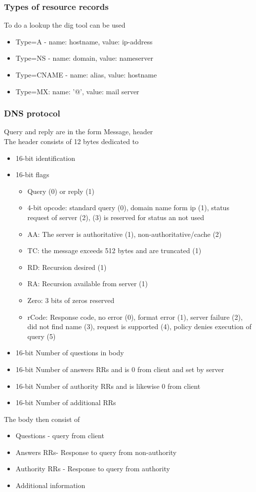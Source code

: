 \documentclass[12pt, a4paper]{article}
\begin{document}
			\subsubsection{Types of resource records}
				To do a lookup the dig tool can be used
				\begin{itemize}
					\item Type=A - name: hostname, value: ip-address
					\item Type=NS - name: domain, value: nameserver
					\item Type=CNAME - name: alias, value: hostname
					\item Type=MX: name: '@', value: mail server
				\end{itemize}
			\subsubsection{DNS protocol}
				Query and reply are in the form Message, header\\
				The header consists of 12 bytes dedicated to
				\begin{itemize}
					\item 16-bit identification
					\item 16-bit flags
					\begin{itemize}
						\item Query (0) or reply (1)
						\item 4-bit opcode: standard query (0), domain name form ip (1), status request of server (2), (3) is reserved for status an not used
						\item AA: The server is authoritative (1), non-authoritative/cache (2)
						\item TC: the message exceeds 512 bytes and are truncated (1)
						\item RD: Recursion desired (1)
						\item RA: Recursion available from server (1)
						\item Zero: 3 bits of zeros reserved
						\item rCode: Response code, no error (0), format error (1), server failure (2), did not find name (3), request is supported (4), policy denies execution of query (5)
					\end{itemize}
					\item 16-bit Number of questions in body
					\item 16-bit Number of answers RRs and is 0 from client and set by server 
					\item 16-bit Number of authority RRs and is likewise 0 from client
					\item 16-bit Number of additional RRs 
				\end{itemize}
				The body then consist of
				\begin{itemize}
					\item Questions - query from client
					\item Answers RRs- Response to query from non-authority
					\item Authority RRs -  Response to query from authority
					\item Additional information 
				\end{itemize}
\end{document}
